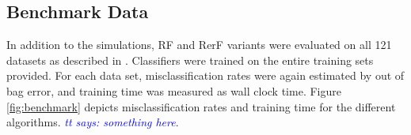 \documentclass{article} %
\providecommand{\tt}[1]{\textcolor{blue}{\it tt says: #1}}
\begin{document}

\subsection{Benchmark Data}

In addition to the simulations, RF and RerF variants were evaluated on all 121 datasets as described in \cite{Delgado14}. Classifiers were trained on the entire training sets provided. For each data set, misclassification rates were again estimated by out of bag error, and training time was measured as wall clock time.  Figure \ref{fig:benchmark} depicts misclassification rates and training time for the different algorithms.  
\tt{something here}.
\end{document}
